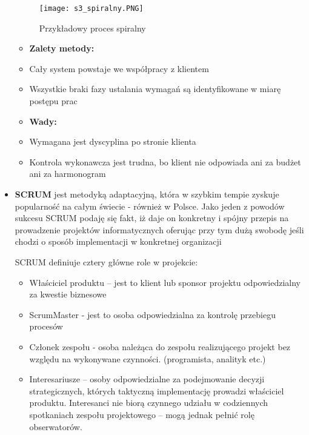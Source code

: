 \begin{itemize}
	\begin{figure}[H]
		\centering
		\texttt{[image: s3\_spiralny.PNG]}
		\caption{Przykładowy proces spiralny}
	\end{figure}
	
	\begin{itemize}
		\setlength\itemsep{1pt}
		\item[] \textbf{Zalety metody:}
		\item Cały system powstaje we współpracy z klientem
		\item Wszystkie braki fazy ustalania wymagań są identyfikowane w miarę postępu prac
	\end{itemize}
	
	\begin{itemize}
		\setlength\itemsep{1pt}
		\item[] \textbf{Wady:}
		\item Wymagana jest dyscyplina po stronie klienta
		\item Kontrola wykonawcza jest trudna, bo klient nie odpowiada ani za budżet ani za harmonogram
	\end{itemize}
	
	\item \textbf{SCRUM} jest metodyką adaptacyjną, która w szybkim tempie zyskuje popularność na całym świecie - również w Polsce. Jako jeden z powodów sukcesu SCRUM podaję się fakt, iż daje on konkretny i spójny przepis na prowadzenie projektów informatycznych oferując przy tym dużą swobodę jeśli chodzi o sposób implementacji w konkretnej organizacji
	
	SCRUM definiuje cztery główne role w projekcie:
	\begin{itemize}
		\setlength\itemsep{1pt}
		\item Właściciel produktu – jest to klient lub sponsor projektu odpowiedzialny za kwestie biznesowe
		\item ScrumMaster - jest to osoba odpowiedzialna za kontrolę przebiegu procesów
		\item Członek zespołu - osoba należąca do zespołu realizującego projekt bez względu na wykonywane czynności. (programista, analityk etc.)
		\item Interesariusze – osoby odpowiedzialne za podejmowanie decyzji strategicznych, których taktyczną implementację prowadzi właściciel produktu. Interesanci nie biorą czynnego udziału w codziennych spotkaniach zespołu projektowego – mogą jednak pełnić rolę obserwatorów.
	\end{itemize}
	

\end{itemize}
